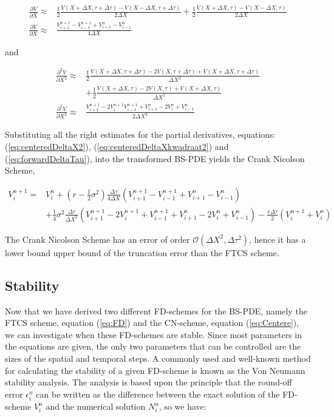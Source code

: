 \documentclass[11pt,a4paper]{article}
\begin{document}
\begin{align} 
\frac{\partial V}{\partial X} \approx & \frac{1}{2} \frac{V(X+\Delta X,\tau+\Delta \tau)-V(X-\Delta X,\tau+\Delta \tau)}{2\Delta X} +\frac{1}{2} \frac{V(X+\Delta X,\tau)-V(X-\Delta X,\tau)}{2\Delta X} \nonumber\\
\frac{\partial V}{\partial X} \approx & \frac{V_{i+1}^{n+1}-V_{i-1}^{n+1}+V_{i+1}^n-V_{i-1}^n}{4 \Delta X}
\label{eq:centeredDeltaX2}
\end{align}

and

\begin{align}
\frac{\partial^2 V}{\partial X^2}\approx & \frac{1}{2} \frac{V(X+\Delta X,\tau+\Delta \tau)-2V(X,\tau+\Delta \tau)+V(X+\Delta X,\tau+ \Delta \tau)}{\Delta X^2} \nonumber\\
&+ \frac{1}{2} \frac{V(X+\Delta X,\tau)-2V(X,\tau)+V(X+\Delta X,\tau)}{\Delta X^2} \nonumber\\
\frac{\partial^2 V}{\partial X^2}\approx & \frac{V_{i+1}^{n+1}-2V_i^{n+1}V_{i-1}^{n+1}+V_{i+1}^n-2V_i^n+V_{i-1}^n}{2\Delta X^2} \label{eq:centeredDeltaXkwadraat2}
\end{align}

Substituting all the right estimates for the partial derivatives, equations: (\ref{eq:centeredDeltaX2}), (\ref{eq:centeredDeltaXkwadraat2}) and (\ref{eq:forwardDeltaTau}), into the transformed BS-PDE yields the Crank Nicolson Scheme,

\begin{align}
V_i^{n+1}=&V_i^n+\left(r-\frac{1}{2}\sigma^2\right)\frac{\Delta \tau}{4 \Delta X}(V_{i+1}^{n+1}-V_{i-1}^{n+1}+V_{i+1}^n-V_{i-1}^n)
\label{eq:Centere}\\
&+\frac{1}{4}\sigma^2\frac{\Delta \tau}{\Delta X^2}(V_{i+1}^{n+1}-2V_i^{n+1}+V_{i-1}^{n+1}+V_{i+1}^n-2V_i^n+V_{i-1}^n)-\frac{r\Delta\tau}{2}(V_i^{n+1}+V_i^n) \nonumber
\end{align}

The Crank Nicolson Scheme has an error of order $\mathcal{O}(\Delta X^2,\Delta \tau^2)$, hence it has a lower bound upper bound of the truncation error than the FTCS scheme.

\subsection{Stability}

Now that we have derived two different FD-schemes for the BS-PDE, namely the FTCS scheme, equation (\ref{eq:FD}) and the CN-scheme, equation (\ref{eq:Centere}), we can investigate when these FD-schemes are stable. Since most parameters in the equations are given, the only two parameters that can be controlled are the sizes of the spatial and temporal steps. A commonly used and well-known method for calculating the stability of a given FD-scheme is known as the Von Neumann stability analysis. The analysis is based upon the principle that the round-off error $\epsilon^n_i$ can be written as the difference between the exact solution of the FD-scheme $V^n_i$ and the numerical solution $N^n_i$, so we have:
\end{document}
